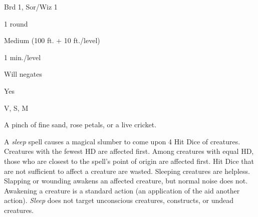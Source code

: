 
\begin{description*}
\item[Level:] Brd 1, Sor/Wiz 1
\item[Casting Time:] 1 round
\item[Range:] Medium (100 ft. + 10 ft./level)
\item[Duration:] 1 min./level
\item[Saving Throw:] Will negates
\item[Spell Resistance:] Yes
\item[Components:] V, S, M
\item[Arcane Material Component:] A pinch of fine sand, rose petals, or a live cricket.
\end{description*}

A \textit{sleep} spell causes a magical slumber to come upon 4 Hit Dice of creatures.
Creatures with the fewest HD are affected first.
Among creatures with equal HD, those who are closest to the spell's point of origin
are affected first. Hit Dice that are not sufficient to affect a creature are wasted.
Sleeping creatures are helpless. Slapping or wounding awakens an affected creature,
but normal noise does not. Awakening a creature is a standard action (an application
of the aid another action).
\textit{Sleep} does not target unconscious creatures, constructs, or undead creatures.